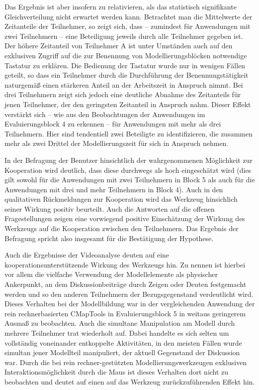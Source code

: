 Das Ergebnis ist aber insofern zu relativieren, als das statistisch signifikante Gleichverteilung nicht erwartet werden kann. Betrachtet man die Mittelwerte der Zeitanteile der Teilnehmer, so zeigt sich, dass -- zumindest für Anwendungen mit zwei Teilnehmern -- eine Beteiligung jeweils durch alle Teilnehmer gegeben ist. Der höhere Zeitanteil von Teilnehmer A ist unter Umständen auch auf den exklusiven Zugriff auf die zur Benennung von Modellierungsblöcken notwendige Tastatur zu erklären. Die Bedienung der Tastatur wurde nur in wenigen Fällen geteilt, so dass ein Teilnehmer durch die Durchführung der Benennungstätigkeit naturgemäß einen stärkeren Anteil an der Arbeitszeit in Anspruch nimmt. Bei drei Teilnehmern zeigt sich jedoch eine deutliche Abnahme des Zeitanteils für jenen Teilnehmer, der den geringsten Zeitanteil in Anspruch nahm. Dieser Effekt verstärkt sich -- wie aus den Beobachtungen der Anwendungen im Evaluierungsblock 4 zu erkennen -- für Anwendungen mit mehr als drei Teilnehmern. Hier sind tendentiell zwei Beteiligte zu identifizieren, die zusammen mehr als zwei Drittel der Modellierungszeit für sich in Anspruch nehmen.  

In der Befragung der Benutzer hinsichtlich der wahrgenommenen Möglichkeit zur Kooperation wird deutlich, dass diese durchwegs als hoch eingeschätzt wird (dies gilt sowohl für die Anwendungen mit zwei Teilnehmern in Block 5 als auch für die Anwendungen mit drei und mehr Teilnehmern in Block 4). Auch in den qualitativen Rückmeldungen zur Kooperation wird das Werkzeug hinsichlich seiner Wirkung positiv beurteilt. Auch die Antworten auf die offenen Fragestellungen zeigen eine vorwiegend positive Einschätzung der Wirkung des Werkzeugs auf die Kooperation zwischen den Teilnehmern. Das Ergebnis der Befragung spricht also insgesamt für die Bestätigung der Hypothese.

Auch die Ergebnisse der Videoanalyse deuten auf eine kooperationsunterstützende Wirkung des Werkzeugs hin. Zu nennen ist hierbei vor allem die vielfache Verwendung der Modellelemente als physischer Ankerpunkt, an dem Diskussionbeiträge durch Zeigen oder Deuten festgemacht werden und so den anderen Teilnehmern der Bezugsgegenstand verdeutlicht wird. Dieses Verhalten bei der Modellbildung war in der vergleichenden Anwendung der rein rechnerbasierten CMapTools in Evaluierungsblock 5 in weitaus geringerem Ausmaß zu beobachten. Auch die simultane Manipulation am Modell durch mehrere Teilnehmer trat wiederholt auf. Dabei handelte es sich selten um vollständig voneinander entkoppelte Aktivitäten, in den meisten Fällen wurde simultan jener Modellteil manipuliert, der aktuell Gegenstand der Diskussion war. Durch die bei rein rechner-gestützten Modellierungswerkzeugen exklusiven Interaktionsmöglichkeit durch die Maus ist dieses Verhalten dort nicht zu beobachten und deutet auf einen auf das Werkzeug zurückzuführenden Effekt hin.   

